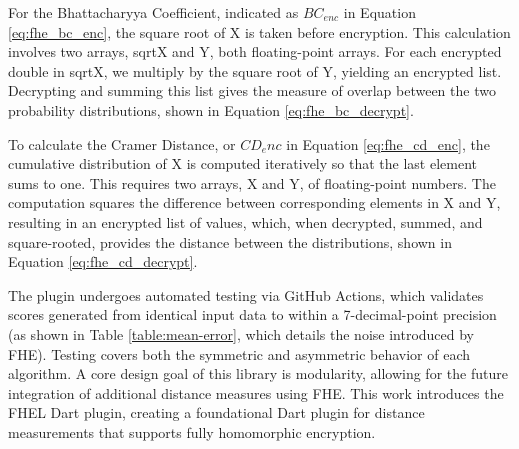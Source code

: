 



For the Bhattacharyya Coefficient, indicated as $BC_{enc}$ in Equation \ref{eq:fhe_bc_enc}, the square root of X is taken before encryption. This calculation involves two arrays, sqrtX and Y, both floating-point arrays. For each encrypted double in sqrtX, we multiply by the square root of Y, yielding an encrypted list. Decrypting and summing this list gives the measure of overlap between the two probability distributions, shown in Equation \ref{eq:fhe_bc_decrypt}.





To calculate the Cramer Distance, or $CD_enc$ in Equation \ref{eq:fhe_cd_enc}, the cumulative distribution of X is computed iteratively so that the last element sums to one. This requires two arrays, X and Y, of floating-point numbers. The computation squares the difference between corresponding elements in X and Y, resulting in an encrypted list of values, which, when decrypted, summed, and square-rooted, provides the distance between the distributions, shown in Equation \ref{eq:fhe_cd_decrypt}.





The plugin undergoes automated testing via GitHub Actions, which validates scores generated from identical input data to within a 7-decimal-point precision (as shown in Table \ref{table:mean-error}, which details the noise introduced by FHE). Testing covers both the symmetric and asymmetric behavior of each algorithm. A core design goal of this library is modularity, allowing for the future integration of additional distance measures using FHE. This work introduces the FHEL Dart plugin, creating a foundational Dart plugin for distance measurements that supports fully homomorphic encryption.
